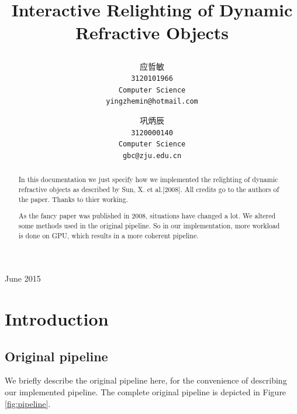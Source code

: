 \documentclass[a4paper]{article}
\begin{document}
\begin{CJK*}{UTF8}{gkai}

\title{
\begin{figure}[!h]
\centering
\end{figure}
\vspace{5mm}
\textbf{Interactive Relighting of Dynamic Refractive Objects}
\vspace{7mm}
\date{}
}


\author{
  应哲敏\\
  \texttt{3120101966}\\
  \texttt{Computer Science}\\
  \texttt{yingzhemin@hotmail.com}
  \and
  巩炳辰\\
  \texttt{3120000140}\\
  \texttt{Computer Science}\\
  \texttt{gbc@zju.edu.cn}
}


\maketitle
\vfill
\begin{center}
June 2015
\end{center}

\newpage


\pagestyle{fancy}
\lhead{}


\begin{abstract}
In this documentation we just specify how we implemented the relighting of dynamic refractive objects as described by Sun, X. et al.[2008].\cite{citation:paper} All credits go to the authors of the paper. Thanks to thier working.


As the fancy paper was published in 2008, situations have changed a lot. We altered some methods used in the original pipeline. So in our implementation, more workload is done on GPU, which results in a more coherent pipeline. 
\end{abstract}


\section{Introduction}
\subsection{Original pipeline}
We briefly describe the original pipeline here, for the convenience of describing our implemented pipeline. The complete original pipeline is depicted in Figure \ref{fig:pipeline}.


\end{CJK*}
\end{document}
